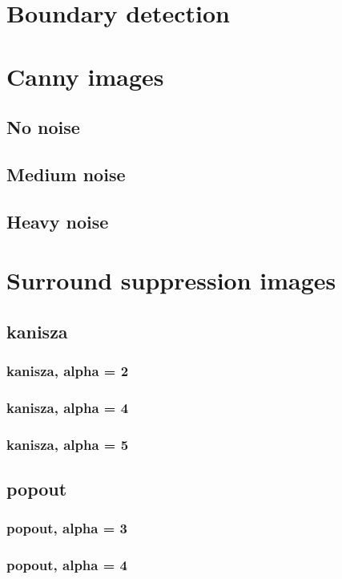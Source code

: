 \documentclass[10pt,a4paper]{article}
\begin{document}


\section{Boundary detection}


\section{Canny images}
\subsection{No noise}

\subsection{Medium noise}

\subsection{Heavy noise}


\section{Surround suppression images}
\subsection{kanisza}

\subsubsection{kanisza, alpha = 2}

\subsubsection{kanisza, alpha = 4}

\subsubsection{kanisza, alpha = 5}


\subsection{popout}

\subsubsection{popout, alpha = 3}

\subsubsection{popout, alpha = 4}

\end{document}
